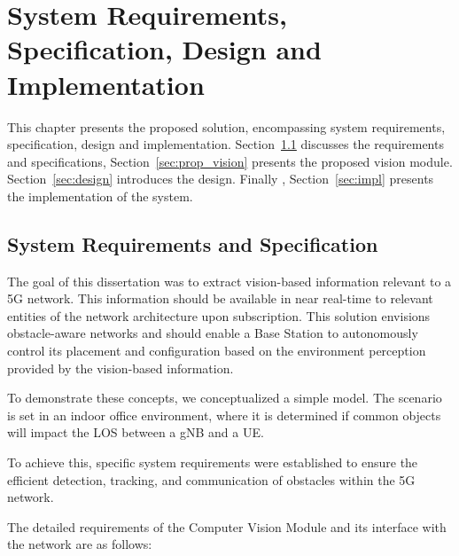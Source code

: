 \chapter{System Requirements, Specification, Design and Implementation}\label{ch:specs_design_implem}

This chapter presents the proposed solution, encompassing system requirements, specification, design and implementation.
Section~\ref{sec:specs} discusses the requirements and specifications, Section~\ref{sec:prop_vision} presents the proposed vision module.
Section~\ref{sec:design} introduces the design.
Finally , Section~\ref{sec:impl} presents the implementation of the system.

\section{System Requirements and Specification}\label{sec:specs}
The goal of this dissertation was to extract vision-based information relevant to a 5G network.
This information should be available in near real-time to relevant entities of the network architecture upon subscription.
This solution envisions obstacle-aware networks and should enable a Base Station to autonomously control its placement and configuration based on the environment perception provided by the vision-based information.

To demonstrate these concepts, we conceptualized a simple model.
The scenario is set in an indoor office environment, where it is determined if common objects will impact the LOS between a gNB and a UE\@.

To achieve this, specific system requirements were established to ensure the efficient detection, tracking, and communication of obstacles within the 5G network.

The detailed requirements of the Computer Vision Module and its interface with the network are as follows:

